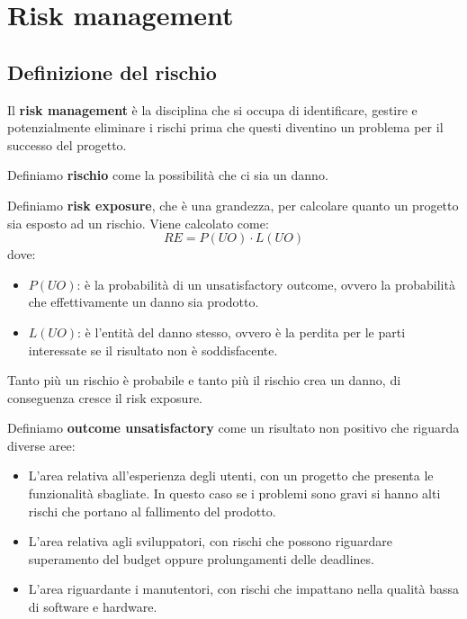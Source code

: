 \chapter{Risk management}
\section{Definizione del rischio}
\begin{definizione}
    Il \textbf{risk management} è la disciplina che si occupa di identificare,
    gestire e potenzialmente eliminare i rischi prima che questi diventino un
    problema per il successo del progetto.
\end{definizione}
\begin{definizione}
    Definiamo \textbf{rischio} come la possibilità che ci sia un danno.
\end{definizione}
\begin{definizione}
    Definiamo \textbf{risk exposure}, che è una grandezza, per calcolare quanto
    un progetto sia esposto ad un rischio. Viene calcolato come:
    \begin{equation}
        RE = P(UO) \cdot L(UO)
    \end{equation}
    dove:
    \begin{itemize}
        \item $P(UO)$: è la probabilità di un unsatisfactory outcome, ovvero la
              probabilità che effettivamente un danno sia prodotto.
        \item $L(UO)$: è l'entità del danno stesso, ovvero è la perdita per le
              parti interessate se il risultato non è soddisfacente.
    \end{itemize}

    Tanto più un rischio è probabile e tanto più il rischio crea un danno, di
    conseguenza cresce il risk exposure.
\end{definizione}
\begin{definizione}
    Definiamo \textbf{outcome unsatisfactory} come un risultato non positivo che
    riguarda diverse aree:
    \begin{itemize}
        \item L'area relativa all'esperienza degli utenti, con un progetto che
              presenta le funzionalità sbagliate. In questo caso se i problemi sono
              gravi si hanno alti rischi che portano al fallimento del prodotto.
        \item L'area relativa agli sviluppatori, con rischi che possono riguardare
              superamento del budget oppure prolungamenti delle deadlines.
        \item L'area riguardante i manutentori, con rischi che impattano nella
              qualità bassa di software e hardware.
    \end{itemize}
\end{definizione}

